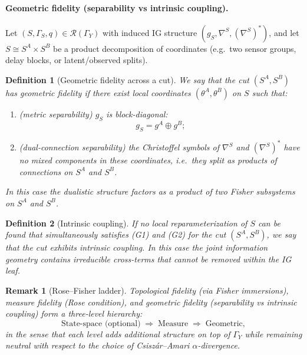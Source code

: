 \documentclass[11pt]{article}
\newtheorem{definition}{Definition}
\newtheorem{remark}{Remark}
\begin{document}
\paragraph{Geometric fidelity (separability vs intrinsic coupling).}

Let $(S,\Gamma_S,q)\in\mathcal R(\Gamma_Y)$ with induced IG structure
$(g_S,\nabla^S,(\nabla^S)^\ast)$, and let
$S \cong S^A\times S^B$ be a product decomposition of coordinates
(e.g.\ two sensor groups, delay blocks, or latent/observed splits).

\begin{definition}[Geometric fidelity across a cut]
\label{def:geom-fidelity-across-cut}
We say that the cut $(S^A,S^B)$ has \emph{geometric fidelity} if there
exist local coordinates $(\theta^A,\theta^B)$ on $S$ such that:
\begin{enumerate}[label=(G\arabic*),leftmargin=1.8em]
  \item (\emph{metric separability}) $g_S$ is block-diagonal:
  \[
    g_S = g^A \oplus g^B;
  \]
  \item (\emph{dual-connection separability}) the Christoffel symbols of
  $\nabla^S$ and $(\nabla^S)^\ast$ have no mixed components in these
  coordinates, i.e.\ they split as products of connections on $S^A$ and
  $S^B$.
\end{enumerate}
In this case the dualistic structure factors as a product of two Fisher
subsystems on $S^A$ and $S^B$.
\end{definition}

\begin{definition}[Intrinsic coupling]
If no local reparameterization of $S$ can be found that simultaneously
satisfies (G1) and (G2) for the cut $(S^A,S^B)$, we say that the cut
exhibits \emph{intrinsic coupling}. In this case the joint information
geometry contains irreducible cross-terms that cannot be removed within
the IG leaf.
\end{definition}

\begin{remark}[Rose--Fisher ladder]
Topological fidelity (via Fisher immersions), measure fidelity (Rose
condition), and geometric fidelity (separability vs intrinsic coupling)
form a three-level hierarchy:
\[
  \text{State-space (optional)}
  \;\Rightarrow\;
  \text{Measure}
  \;\Rightarrow\;
  \text{Geometric},
\]
in the sense that each level adds additional structure on top of
$\Gamma_Y$ while remaining neutral with respect to the choice of
Csiszár--Amari $\alpha$-divergence.
\end{remark}
\end{document}
